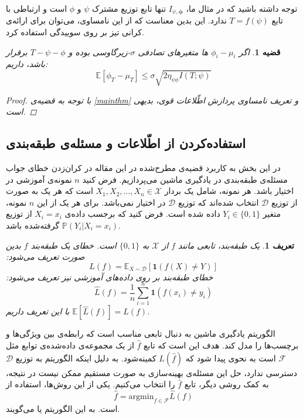 \documentclass[a4paper,12pt]{article}
\newtheorem{den}{{\large\bf تعریف}}[section]
\newtheorem{thm}{{\large\bf قضیه}}[section]
\newcommand{\E}{\mathbb{E}}
\newcommand{\Prob}{\mathbb{P}}
\newcommand{\bfphi}{\bm {\phi}}
\begin{document}
	توجه داشته باشید که در مثال ما،
	$I_{\psi, \bfphi}$
	تنها تابع توزیع مشترک 
	$\psi$
	و
	$\phi$
	است و ارتباطی با تابع 
	$T = f(\psi)$
	ندارد.  این بدین معناست که از این نامساوی، می‌توان برای ارائه‌ی کرانی تیز بر روی سوییدگی استفاده کرد.
	
	\begin{thm}
		اگر 
		$\phi_i - \mu_i$
		ها متغیرهای تصادفی 
		$\sigma$-زیرگاوسی
		بوده و 
		$T-\psi-\phi$
		برقرار باشد، داریم:
		\begin{equation}
		\E[\phi_T - \mu_T] \leq \sigma \sqrt{2\eta_{\psi\phi} I(T; \psi)}
		\end{equation}
		\begin{proof}
			با توجه به قضیه‌ی 
			\eqref{mainthm}
			و تعریف نامساوی پردازش اطّلاعات قوی، بدیهی است.
		\end{proof}
	\end{thm}


\subsection{استفاده‌کردن از اطّلاعات و مسئله‌ی طبقه‌بندی}
در این بخش به کاربرد قضیه‌ی مطرح‌شده در این مقاله در کران‌زدن خطای جواب مسئله‌ی طبقه‌بندی در یادگیری ماشین می‌پردازیم. فرض کنید
$n$
نمونه‌ی آموزشی در اختیار باشد. هر نمونه، شامل یک بردار 
$X_1, X_2, \dots, X_n \in \mathcal{X}$
است که هر یک به صورت 
از توزیع 
$\mathcal{D}$
انتخاب شده‌اند که توزیع 
$\mathcal{D}$
در اختیار نمی‌باشد. برای هر یک از این 
$n$
نمونه،  متغیر 
$Y_i \in \{0, 1\}$
داده شده است. فرض کنید که برجسب داده‌‌ی
$X_i = x_i$
از توزیع 
$\Prob (Y_i|X_i = x_i)$
گرفته‌شده باشد. 

\begin{den}
	یک طبقه‌بند، تابعی مانند $f$ از 
	$\mathcal{X}$
	به 
	$\{0, 1\}$
	است. خطای یک طبقه‌بند $f$ بدین صورت تعریف می‌شود:
	$$L(f) = \E_{X \sim \mathcal{D}} \left[\mathbf{1}(f(X) \neq Y)\right]$$
	خطای طبقه‌بند بر روی داده‌های آموزشی نیز تعریف می‌شود:
	$$\hat{L}(f)  = \frac{1}{n} \sum_{i = 1}^{n} \mathbf{1} (f(x_i) \neq y_i)$$
	با این تعریف داریم
	$\E[\hat{L}(f)] = L(f)$.
\end{den}

الگوریتم یادگیری ماشین به دنبال تابعی مناسب است که رابطه‌ی بین ویژگی‌ها و برچسب‌ها را مدل کند. هدف این است که تابع
$\hat{f}$
از یک مجموعه‌ی داده‌شده‌ی توابع مثل 
$\mathcal{F}$
است به نحوی  پیدا شود که 
$L(\hat{f}) $
کمینه‌شود. به دلیل اینکه الگوریتم به توزیع 
$\mathcal{D}$
دسترسی ندارد، حل این مسئله‌ی بهینه‌سازی به صورت مستقیم ممکن نیست در نتیجه، به کمک روشی دیگر، تابع 
$\hat{f}$
را انتخاب می‌کنیم. یکی از این روش‌ها، استفاده از 
$$\hat{f} = \mathrm{argmin}_{f \in\mathcal{F}} \hat{L}(f)$$
است. به این الگوریتم
یا 
می‌گویند.
\end{document}

